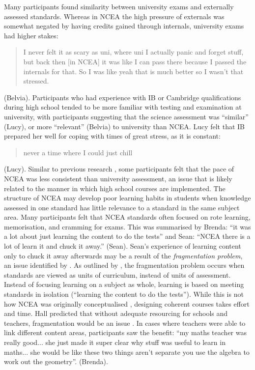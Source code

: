 \documentclass[a4paper,man,natbib]{apa6}
\begin{document}
Many participants found similarity between university exams and externally assessed standards. Whereas in NCEA the high pressure of externals was somewhat negated by having credits gained through internals, university exams had higher stakes: \blockquote{I never felt it as scary as uni, where uni I actually panic and forget stuff, but back then [in NCEA] it was like I can pass there because I passed the internals for that. So I was like yeah that is much better so I wasn't that stressed.} (Belvia). Participants who had experience with IB or Cambridge qualifications during high school tended to be more familiar with testing and examination at university, with participants suggesting that the science assessment was ``similar'' (Lucy), or more ``relevant'' (Belvia) to university than NCEA. Lucy felt that IB prepared her well for coping with times of great stress, as it is constant: \blockquote{never a time where I could just chill 
} (Lucy). Similar to previous research \citep{vlaardingerbroek2006transition}, some participants felt that the pace of NCEA was less consistent than university assessment, an issue that is likely related to the manner in which high school courses are implemented. 
The structure of NCEA may develop poor learning habits in students when knowledge assessed in one standard has little relevance to a standard in the same subject area. Many participants felt that NCEA standards often focused on rote learning, memorisation, and cramming for exams. This was summarised by Brenda: ``it was a lot about just learning the content to do the tests'' and Sean: ``NCEA there is a lot of learn it and chuck it away.'' (Sean). Sean's experience of learning content only to chuck it away afterwards may be a result of the \textit{fragmentation problem}, an issue identified by \citep{hall2000national}. As outlined by \cite{hipkins2016ncea}, the fragmentation problem occurs when standards are viewed as units of curriculum, instead of units of assessment. Instead of focusing learning on a subject as whole, learning is based on meeting standards in isolation (``learning the content to do the tests''). While this is not how NCEA was originally conceptualised \citep{hipkins2016ncea}, designing coherent courses takes effort and time. Hall predicted that without adequate resourcing for schools and teachers, fragmentation would be an issue \citep{hall2000national}. In cases where teachers were able to link different content areas, participants saw the benefit: ``my maths teacher was really good... she just made it super clear why stuff was useful to learn in maths... she would be like these two things aren't separate you use the algebra to work out the geometry''. (Brenda).
 
\end{document}
